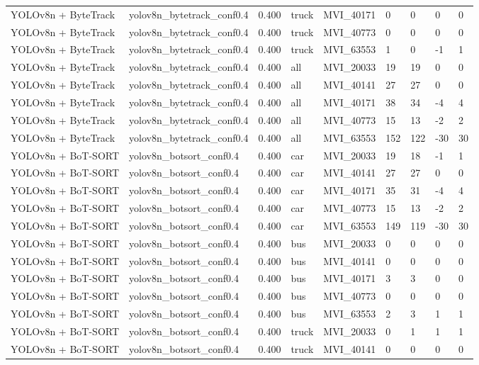 \begin{tabular}{lllllllll}
YOLOv8n + ByteTrack & yolov8n\_bytetrack\_conf0.4 & 0.400 & truck & MVI\_40171 & 0 & 0 & 0 & 0 \\
YOLOv8n + ByteTrack & yolov8n\_bytetrack\_conf0.4 & 0.400 & truck & MVI\_40773 & 0 & 0 & 0 & 0 \\
YOLOv8n + ByteTrack & yolov8n\_bytetrack\_conf0.4 & 0.400 & truck & MVI\_63553 & 1 & 0 & -1 & 1 \\
YOLOv8n + ByteTrack & yolov8n\_bytetrack\_conf0.4 & 0.400 & all & MVI\_20033 & 19 & 19 & 0 & 0 \\
YOLOv8n + ByteTrack & yolov8n\_bytetrack\_conf0.4 & 0.400 & all & MVI\_40141 & 27 & 27 & 0 & 0 \\
YOLOv8n + ByteTrack & yolov8n\_bytetrack\_conf0.4 & 0.400 & all & MVI\_40171 & 38 & 34 & -4 & 4 \\
YOLOv8n + ByteTrack & yolov8n\_bytetrack\_conf0.4 & 0.400 & all & MVI\_40773 & 15 & 13 & -2 & 2 \\
YOLOv8n + ByteTrack & yolov8n\_bytetrack\_conf0.4 & 0.400 & all & MVI\_63553 & 152 & 122 & -30 & 30 \\
YOLOv8n + BoT-SORT & yolov8n\_botsort\_conf0.4 & 0.400 & car & MVI\_20033 & 19 & 18 & -1 & 1 \\
YOLOv8n + BoT-SORT & yolov8n\_botsort\_conf0.4 & 0.400 & car & MVI\_40141 & 27 & 27 & 0 & 0 \\
YOLOv8n + BoT-SORT & yolov8n\_botsort\_conf0.4 & 0.400 & car & MVI\_40171 & 35 & 31 & -4 & 4 \\
YOLOv8n + BoT-SORT & yolov8n\_botsort\_conf0.4 & 0.400 & car & MVI\_40773 & 15 & 13 & -2 & 2 \\
YOLOv8n + BoT-SORT & yolov8n\_botsort\_conf0.4 & 0.400 & car & MVI\_63553 & 149 & 119 & -30 & 30 \\
YOLOv8n + BoT-SORT & yolov8n\_botsort\_conf0.4 & 0.400 & bus & MVI\_20033 & 0 & 0 & 0 & 0 \\
YOLOv8n + BoT-SORT & yolov8n\_botsort\_conf0.4 & 0.400 & bus & MVI\_40141 & 0 & 0 & 0 & 0 \\
YOLOv8n + BoT-SORT & yolov8n\_botsort\_conf0.4 & 0.400 & bus & MVI\_40171 & 3 & 3 & 0 & 0 \\
YOLOv8n + BoT-SORT & yolov8n\_botsort\_conf0.4 & 0.400 & bus & MVI\_40773 & 0 & 0 & 0 & 0 \\
YOLOv8n + BoT-SORT & yolov8n\_botsort\_conf0.4 & 0.400 & bus & MVI\_63553 & 2 & 3 & 1 & 1 \\
YOLOv8n + BoT-SORT & yolov8n\_botsort\_conf0.4 & 0.400 & truck & MVI\_20033 & 0 & 1 & 1 & 1 \\
YOLOv8n + BoT-SORT & yolov8n\_botsort\_conf0.4 & 0.400 & truck & MVI\_40141 & 0 & 0 & 0 & 0 \\

\end{tabular}
